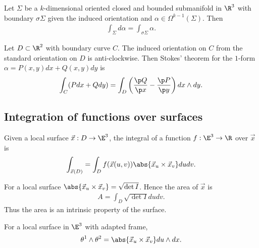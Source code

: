 \documentclass{article}
\begin{document}
\begin{theorem}[Stokes]
    Let $\Sigma$ be a $k$-dimensional oriented closed and bounded submanifold in $\R^3$ with 
    boundary $\sigma\Sigma$ given the induced orientation and $\alpha\in\Omega^{k-1}(\Sigma)$.
    Then
    \begin{align*}
        \int_\Sigma d\alpha = \int_{\sigma\Sigma}\alpha.
    \end{align*}
\end{theorem}

\begin{corollary}[Green]
    Let $D\subset\R^2$ with boundary curve $C$. The induced orientation on $C$ from 
    the standard orientation on $D$ is anti-clockwise. Then Stokes' theorem for the $1$-form 
    $\alpha=P(x,y)dx + Q(x,y)dy$ is 
    \begin{align*}
        \int_C(Pdx + Qdy) = \int_D\left(\frac{\p Q}{\p x}-\frac{\p P}{\p y}\right)dx\wedge dy. 
    \end{align*} 
\end{corollary}

\subsection{Integration of functions over surfaces}

\begin{definition}
    Given a local surface $\vec x:D\to\E^3$, the integral of a 
    function $f:\E^3\to\R$ over $\vec x$ is 
    \begin{align*}
        \int_{\vec x(D)} = \int_D f(\vec x(u,v))\abs{\vec x_u \times \vec x_v}dudv.
    \end{align*}
\end{definition}

\begin{lemma}
    For a local surface $\abs{\vec x_u \times \vec x_v}=\sqrt{\det I}$. Hence the area 
    of $\vec x$ is 
    \begin{align*}
        A = \int_D \sqrt{\det I}dudv.
    \end{align*}
    Thus the area is an intrinsic property of the surface.
\end{lemma}

\begin{lemma}
    For a local surface in $\E^3$ with adapted frame,
    \begin{align*}
        \theta^1\wedge\theta^2 = \abs{\vec x_u \times \vec x_v} du \wedge dx.
    \end{align*}
\end{lemma}
\end{document}
